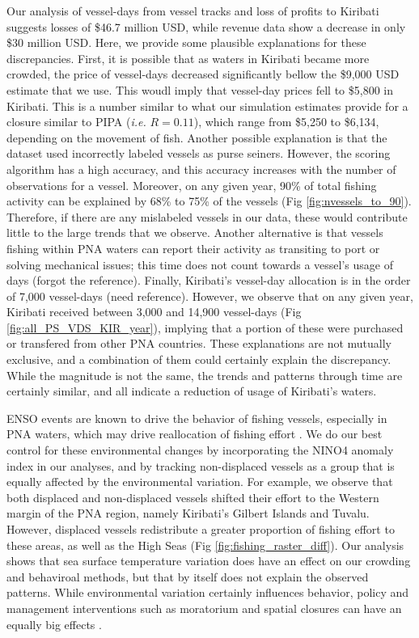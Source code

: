 \documentclass[9p,twocolumn,twoside,lineno]{pnas-new}
\begin{document}
Our analysis of vessel-days from vessel tracks and loss of profits to Kiribati suggests losses of \$46.7 million USD, while revenue data show a decrease in only \$30 million USD. Here, we provide some plausible explanations for these discrepancies. First, it is possible that as waters in Kiribati became more crowded, the price of vessel-days decreased significantly bellow the \$9,000 USD estimate that we use. This woudl imply that vessel-day prices fell to \$5,800 in Kiribati. This is a number similar to what our simulation estimates provide for a closure similar to PIPA (\emph{i.e.} $R = 0.11$), which range from \$5,250 to \$6,134, depending on the movement of fish. Another possible explanation is that the dataset used incorrectly labeled vessels as purse seiners. However, the scoring algorithm has a high accuracy, and this accuracy increases with the number of observations for a vessel. Moreover, on any given year, 90\% of total fishing activity can be explained by 68\% to 75\% of the vessels (Fig \ref{fig:nvessels_to_90}). Therefore, if there are any mislabeled vessels in our data, these would contribute little to the large trends that we observe. Another alternative is that vessels fishing within PNA waters can report their activity as transiting to port or solving mechanical issues; this time does not count towards a vessel's usage of days (forgot the reference). Finally, Kiribati's vessel-day allocation is in the order of 7,000 vessel-days (need reference). However, we observe that on any given year, Kiribati received between 3,000 and 14,900 vessel-days (Fig \ref{fig:all_PS_VDS_KIR_year}), implying that a portion of these were purchased or transfered from other PNA countries. These explanations are not mutually exclusive, and a combination of them could certainly explain the discrepancy. While the magnitude is not the same, the trends and patterns through time are certainly similar, and all indicate a reduction of usage of Kiribati's waters.

ENSO events are known to drive the behavior of fishing vessels, especially in PNA waters, which may drive reallocation of fishing effort \cite{lehodey_1997,kroodsma_2018,aqorau_2018}. We do our best control for these environmental changes by incorporating the NINO4 anomaly index in our analyses, and by tracking non-displaced vessels as a group that is equally affected by the environmental variation. For example, we observe that both displaced and non-displaced vessels shifted their effort to the Western margin of the PNA region, namely Kiribati's Gilbert Islands and Tuvalu. However, displaced vessels redistribute a greater proportion of fishing effort to these areas, as well as the High Seas (Fig \ref{fig:fishing_raster_diff}). Our analysis shows that sea surface temperature variation does have an effect on our crowding and behaviroal methods, but that by itself does not explain the observed patterns. While environmental variation certainly influences behavior, policy and management interventions such as moratorium and spatial closures can have an equally big effects \cite{kroodsma_2018}.
\end{document}
